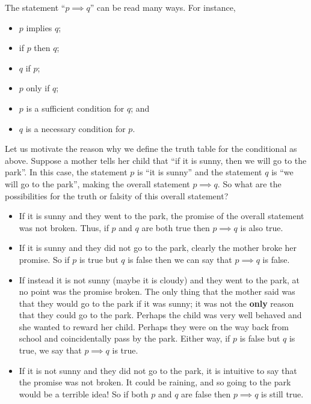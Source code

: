 \begin{remark}
    The statement ``$p \implies q$'' can be read many ways. For instance,
    \begin{itemize}
        \item $p$ implies $q$;
        \item if $p$ then $q$;
        \item $q$ if $p$;
        \item $p$ only if $q$;
        \item $p$ is a sufficient condition for $q$; and
        \item $q$ is a necessary condition for $p$.
    \end{itemize}
\end{remark}

Let us motivate the reason why we define the truth table for the conditional as above. Suppose a mother tells her child that ``if it is sunny, then we will go to the park''. In this case, the statement $p$ is ``it is sunny'' and the statement $q$ is ``we will go to the park'', making the overall statement $p \implies q$. So what are the possibilities for the truth or falsity of this overall statement?
\begin{itemize}
    \item If it is sunny and they went to the park, the promise of the overall statement was not broken. Thus, if $p$ and $q$ are both true then $p \implies q$ is also true.
    \item If it is sunny and they did not go to the park, clearly the mother broke her promise. So if $p$ is true but $q$ is false then we can say that $p \implies q$ is false.
    \item If instead it is not sunny (maybe it is cloudy) and they went to the park, at no point was the promise broken. The only thing that the mother said was that they would go to the park if it was sunny; it was not the \textbf{only} reason that they could go to the park. Perhaps the child was very well behaved and she wanted to reward her child. Perhaps they were on the way back from school and coincidentally pass by the park. Either way, if $p$ is false but $q$ is true, we say that $p \implies q$ is true.
    \item If it is not sunny and they did not go to the park, it is intuitive to say that the promise was not broken. It could be raining, and so going to the park would be a terrible idea! So if both $p$ and $q$ are false then $p \implies q$ is still true.
\end{itemize}

